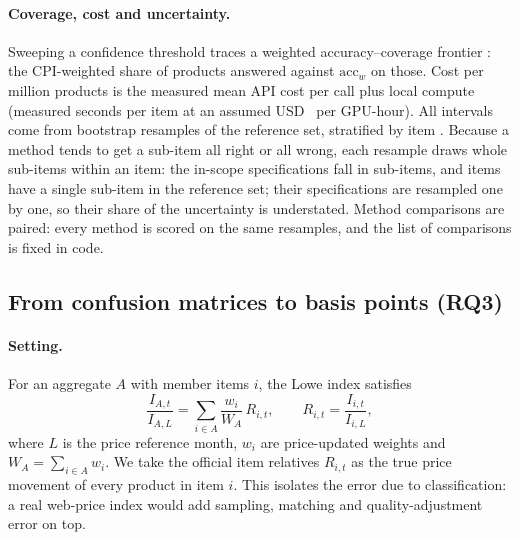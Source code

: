 \paragraph{Coverage, cost and uncertainty.} Sweeping a confidence threshold traces a
weighted accuracy--coverage frontier \citep{geifman2017selective}: the CPI-weighted share of
products answered against $\mathrm{acc}_w$ on those. Cost per million products is the measured
mean API cost per call plus local compute (measured seconds per item at an assumed
USD~\CfgGpuUSDHour{} per GPU-hour). All intervals come from \CfgBoot{} bootstrap resamples of the
reference set, stratified by item \citep{efron1993bootstrap}. Because a method tends to get
a sub-item all right or all wrong, each resample draws whole sub-items within an item: the
\NRefInScope{} in-scope specifications fall in \NRefSubitems{} sub-items, and \NRefItemsOneSubitem{}
items have a single sub-item in the reference set; their specifications are resampled one by
one, so their share of the uncertainty is understated. Method comparisons are
paired: every method is scored on the same resamples, and the list of comparisons is
fixed in code.

\subsection{From confusion matrices to basis points (RQ3)}\label{sec:sim}

\paragraph{Setting.} For an aggregate $A$ with member items $i$, the Lowe index satisfies
\begin{equation}
\frac{I_{A,t}}{I_{A,L}} = \sum_{i \in A} \frac{w_i}{W_A}\, R_{i,t}, \qquad
R_{i,t} = \frac{I_{i,t}}{I_{i,L}},
\label{eq:lowe}
\end{equation}
where $L$ is the price reference month, $w_i$ are price-updated weights and
$W_A = \sum_{i\in A} w_i$. We take the official item relatives $R_{i,t}$ as the true price
movement of every product in item $i$. This isolates the error due to classification: a
real web-price index would add sampling, matching and quality-adjustment error on top.

